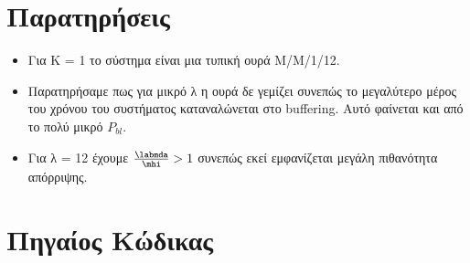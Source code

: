 \section*{Παρατηρήσεις}
\begin{itemize}
        \item Για Κ = 1 το σύστημα είναι μια τυπική ουρά Μ/Μ/1/12. 
        \item Παρατηρήσαμε πως για μικρό λ η ουρά δε γεμίζει συνεπώς το
            μεγαλύτερο μέρος του χρόνου του συστήματος καταναλώνεται στο
            buffering. Αυτό φαίνεται και από το πολύ μικρό $P_{bl}$.
        \item Για λ = 12 έχουμε $\frac{\labmda}{\mhi} > 1$ συνεπώς εκεί
            εμφανίζεται μεγάλη πιθανότητα απόρριψης.
\end{itemize}

\pagebreak
\section*{Πηγαίος Κώδικας}

\inputminted[linenos,fontsize=\scriptsize,frame=leftline]{cpp}{files/main.cpp}


